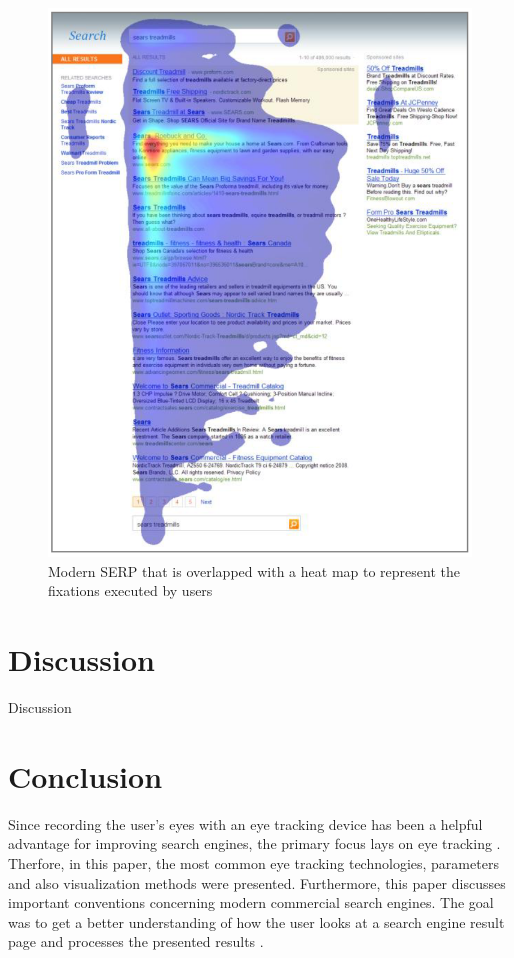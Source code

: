 \begin{figure}[!ht]
    \centering
    \includegraphics[width=1 \linewidth]{images/SERP_buscher2010good.png}
    \caption{
        Modern SERP that is overlapped with a heat map to represent the fixations executed by users \autocite[42]{buscher2010good}
    }
    \label{figure:Serp}
\end{figure}



\section{Discussion}
\label{section:Discussion}
Discussion

\section{Conclusion}
\label{section:Conclusion}
Since recording the user's eyes with an eye tracking device has been a helpful advantage for improving search engines, the primary focus lays on eye tracking \autocite{liu2015influence}. Therfore, in this paper, the most common eye tracking technologies, parameters and also visualization methods were presented. Furthermore, this paper discusses important conventions concerning modern commercial search engines. The goal was to get a better understanding of how the user looks at a search engine result page and processes the presented results \autocite{biedert2010eyebook}.

